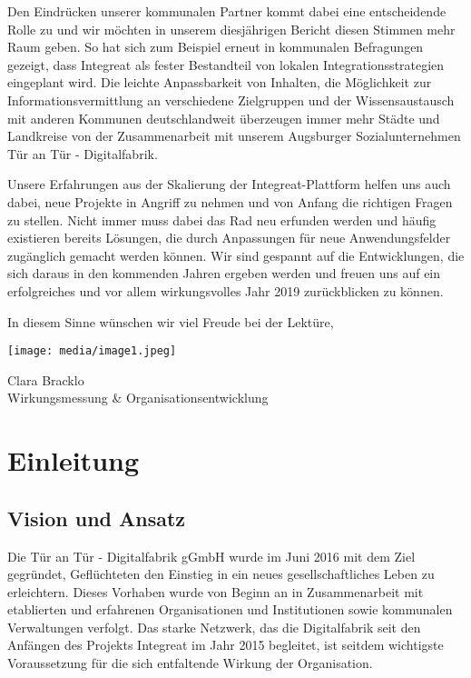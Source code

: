\documentclass[12pt, a4paper]{article} %
\begin{document}
Den Eindrücken unserer kommunalen Partner kommt dabei eine entscheidende
Rolle zu und wir möchten in unserem diesjährigen Bericht diesen Stimmen
mehr Raum geben. So hat sich zum Beispiel erneut in kommunalen
Befragungen gezeigt, dass Integreat als fester Bestandteil von lokalen
Integrationsstrategien eingeplant wird. Die leichte Anpassbarkeit von
Inhalten, die Möglichkeit zur Informationsvermittlung an verschiedene
Zielgruppen und der Wissensaustausch mit anderen Kommunen
deutschlandweit überzeugen immer mehr Städte und Landkreise von der
Zusammenarbeit mit unserem Augsburger Sozialunternehmen Tür an Tür -
Digitalfabrik.

Unsere Erfahrungen aus der Skalierung der Integreat-Plattform helfen uns
auch dabei, neue Projekte in Angriff zu nehmen und von Anfang die
richtigen Fragen zu stellen. Nicht immer muss dabei das Rad neu erfunden
werden und häufig existieren bereits Lösungen, die durch Anpassungen für
neue Anwendungsfelder zugänglich gemacht werden können. Wir sind
gespannt auf die Entwicklungen, die sich daraus in den kommenden Jahren
ergeben werden und freuen uns auf ein erfolgreiches und vor allem
wirkungsvolles Jahr 2019 zurückblicken zu können.

In diesem Sinne wünschen wir viel Freude bei der Lektüre,

\texttt{[image: media/image1.jpeg]}

Clara Bracklo\\
Wirkungsmessung \& Organisationsentwicklung

\hypertarget{einleitung}{%
\section{Einleitung}\label{einleitung}}

\hypertarget{vision-und-ansatz}{%
\subsection{Vision und Ansatz}\label{vision-und-ansatz}}

Die Tür an Tür - Digitalfabrik gGmbH wurde im Juni 2016 mit dem Ziel
gegründet, Geflüchteten den Einstieg in ein neues gesellschaftliches
Leben zu erleichtern. Dieses Vorhaben wurde von Beginn an in
Zusammenarbeit mit etablierten und erfahrenen Organisationen und
Institutionen sowie kommunalen Verwaltungen verfolgt. Das starke
Netzwerk, das die Digitalfabrik seit den Anfängen des Projekts Integreat
im Jahr 2015 begleitet, ist seitdem wichtigste Voraussetzung für die
sich entfaltende Wirkung der Organisation.
\end{document}
